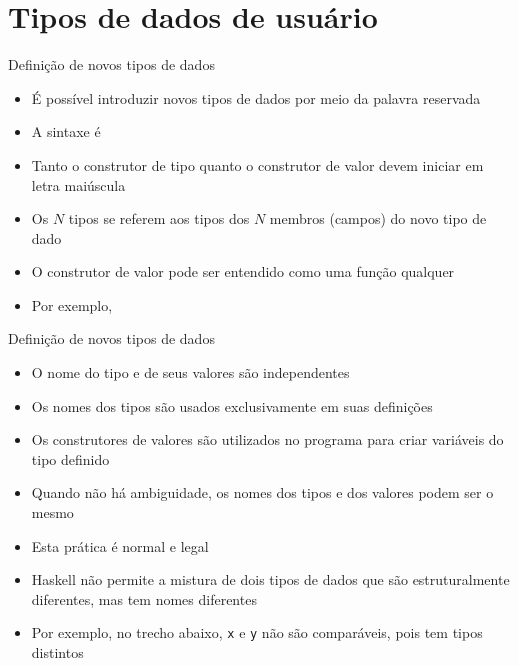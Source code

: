 \section{Tipos de dados de usuário}

\begin{frame}[fragile]{Definição de novos tipos de dados}

    \begin{itemize}
        \item É possível introduzir novos tipos de dados por meio da palavra reservada

        \item A sintaxe é


        \item Tanto o construtor de tipo quanto o construtor de valor devem iniciar em
            letra maiúscula

        \item Os $N$ tipos se referem aos tipos dos $N$ membros (campos) do novo tipo de dado

        \item O construtor de valor pode ser entendido como uma função qualquer

        \item Por exemplo, 

    \end{itemize}

\end{frame}

\begin{frame}[fragile]{Definição de novos tipos de dados}

    \begin{itemize}
        \item O nome do  tipo e de seus valores são independentes

        \item Os nomes dos tipos são usados exclusivamente em suas definições

        \item Os construtores de valores são utilizados no programa para criar variáveis do
            tipo definido

        \item Quando não há ambiguidade, os nomes dos tipos e dos valores podem ser o mesmo

        \item Esta prática é normal e legal

        \item Haskell não permite a mistura de dois tipos de dados que são estruturalmente
            diferentes, mas tem nomes diferentes

        \item Por exemplo, no trecho abaixo,
        \texttt{x} e \texttt{y} não são comparáveis, pois tem tipos distintos
    \end{itemize}

\end{frame}
